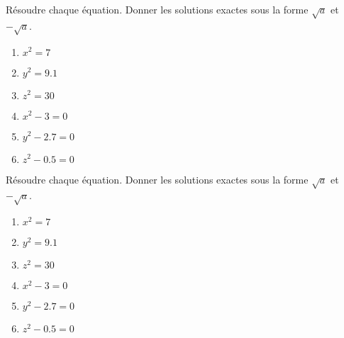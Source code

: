 \begin{exercice*}
    Résoudre chaque équation. Donner les solutions exactes sous la forme $\sqrt{a}$ et $-\sqrt{a}$.
    \begin{multicols}{2}
        \begin{enumerate}
            \item $x^2=7$
            \item $y^2=\num{9.1}$
            \item $z^2=30$
            \item $x^2-3=0$
            \item $y^2-\num{2.7}=0$
            \item $z^2-\num{0.5}=0$
        \end{enumerate}
    \end{multicols}
\end{exercice*}
\begin{corrige}
    Résoudre chaque équation. Donner les solutions exactes sous la forme $\sqrt{a}$ et $-\sqrt{a}$.

    \begin{enumerate}
        \item $x^2=7$
        
        \item $y^2=\num{9.1}$
        
        \item $z^2=30$
        
        \item $x^2-3=0$
        
        \item $y^2-\num{2.7}=0$
        
        \item $z^2-\num{0.5}=0$
        
    \end{enumerate}
\end{corrige}
